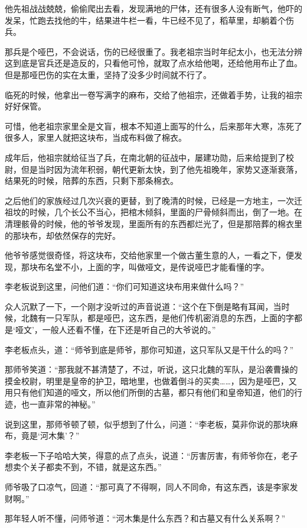 他先祖战战兢兢，偷偷爬出去看，发现满地的尸体，还有很多人没有断气，他吓的发呆，忙跑去找他的牛，结果进牛栏一看，牛已经不见了，稻草里，却躺着个伤兵。

那兵是个哑巴，不会说话，伤的已经很重了。我老祖宗当时年纪太小，也无法分辨这到底是官兵还是造反的，只看他可怜，就取了点水给他喝，还给他用布止了血。但是那哑巴伤的实在太重，坚持了没多少时间就不行了。

临死的时候，他拿出一卷写满字的麻布，交给了他祖宗，还做着手势，让我的祖宗好好保管。

可惜，他老祖宗家里全是文盲，根本不知道上面写的什么，后来那年大寒，冻死了很多人，家里人就把这块布，当成布料做了棉衣。

成年后，他祖宗就给征当了兵，在南北朝的征战中，屡建功勋，后来给提到了校尉，但是当时因为流年积弱，朝代更新太快，到了他先祖晚年，家势又逐渐衰落，结果死的时候，陪葬的东西，只剩下那条棉衣。

之后他们的家族经过几次兴衰的更替，到了晚清的时候，已经是一方地主，一次迁祖坟的时候，几个长公不当心，把棺木倾斜，里面的尸骨倾斜而出，倒了一地。在清理骸骨的时候，他的爷爷发现，里面所有的东西都烂光了，但是那陪葬的棉衣里的那块布，却依然保存的完好。

他爷爷感觉很奇怪，将这块布，交给他家里一个做古董生意的人，一看之下，便发现，那块布名堂不小，上面的字，叫做哑文，是传说哑巴才能看懂的字。

李老板说到这里，问他们道：“你们可知道这块布用来做什么吗？”

众人沉默了一下，一个刚才没听过的声音说道：“这个在下倒是略有耳闻，当时候，北魏有一只军队，都是哑巴，这东西，是他们传机密消息的东西，上面的字都是‘哑文’，一般人还看不懂，在下还是听自己的大爷说的。”

李老板点头，道：“师爷到底是师爷，那你可知道，这只军队又是干什么的吗？”

那师爷笑道：“那我就不甚清楚了，不过，听说，这只北魏的军队，是沿袭曹操的摸金校尉，明里是皇帝的护卫，暗地里，也做着倒斗的买卖……，因为是哑巴，又用只有他们知道的哑文，所以他们所倒的古墓，都只有他们和皇帝知道，他们的行迹，也一直非常的神秘。”

说到这里，那师爷顿了顿，似乎想到了什么，问道：“李老板，莫非你说的那块麻布，竟是‘河木集’？”

李老板一下子哈哈大笑，得意的点了点头，说道：“厉害厉害，有师爷你在，老子想卖个关子都卖不到，不错，就是这东西。”

师爷吸了口凉气，回道：“那可真了不得啊，同人不同命，有这东西，该是李家发财啊。”

那年轻人听不懂，问师爷道：“河木集是什么东西？和古墓又有什么关系啊？”

